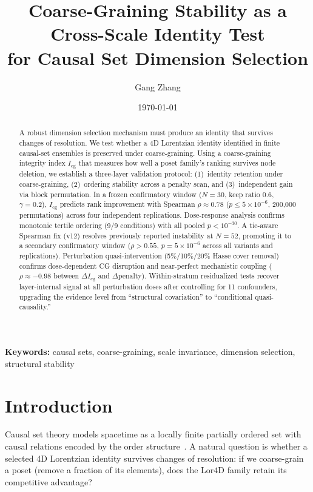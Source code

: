 \documentclass[12pt,a4paper]{article}
\title{Coarse-Graining Stability as a Cross-Scale Identity Test\\
  for Causal Set Dimension Selection}
\author{Gang Zhang}
\date{\today}
\newcommand{\Lor}{\mathrm{Lor4D}}
\newcommand{\Icg}{I_{\mathrm{cg}}}
\begin{document}
\maketitle

\begin{abstract}
A robust dimension selection mechanism must produce an identity that survives
changes of resolution.
We test whether a 4D Lorentzian identity identified in finite causal-set
ensembles is preserved under coarse-graining.
Using a coarse-graining integrity index $\Icg$ that measures how well a poset
family's ranking survives node deletion, we establish a three-layer validation
protocol: (1)~identity retention under coarse-graining, (2)~ordering stability
across a penalty scan, and (3)~independent gain via block permutation.
In a frozen confirmatory window ($N=30$, keep ratio $0.6$, $\gamma=0.2$),
$\Icg$ predicts rank improvement with Spearman $\rho\approx 0.78$ ($p\leq
5\times 10^{-6}$, 200{,}000 permutations) across four independent replications.
Dose-response analysis confirms monotonic tertile ordering (9/9 conditions) with
all pooled $p<10^{-30}$.
A tie-aware Spearman fix (v12) resolves previously reported instability at
$N=52$, promoting it to a secondary confirmatory window ($\rho>0.55$, $p=5\times
10^{-6}$ across all variants and replications).
Perturbation quasi-intervention (5\%/10\%/20\% Hasse cover removal) confirms
dose-dependent CG disruption and near-perfect mechanistic coupling
($\rho\approx -0.98$ between $\Delta\Icg$ and $\Delta$penalty).
Within-stratum residualized tests recover layer-internal signal at all
perturbation doses after controlling for 11 confounders, upgrading the evidence
level from ``structural covariation'' to ``conditional quasi-causality.''
\end{abstract}

\noindent\textbf{Keywords:}
causal sets, coarse-graining, scale invariance, dimension selection,
structural stability

\section{Introduction}

Causal set theory models spacetime as a locally finite partially ordered set
with causal relations encoded by the order structure~\cite{Surya2019}.
A natural question is whether a selected 4D Lorentzian identity survives
changes of resolution:
if we coarse-grain a poset (remove a fraction of its elements), does the
$\Lor$ family retain its competitive advantage?
\end{document}
